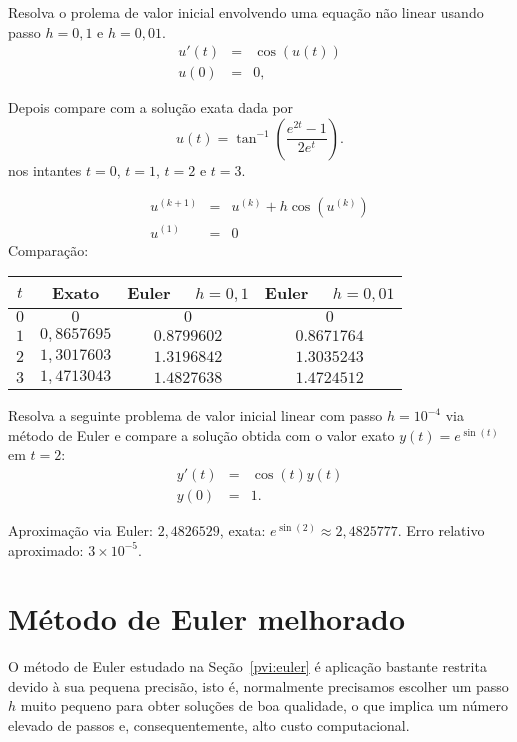 \begin{exer} Resolva o prolema de valor inicial envolvendo uma equação não linear usando passo $h=0,1$ e $h=0,01$. 
 \begin{eqnarray*}
    u'(t)&=&\cos(u(t))\\
    u(0)&=&0,
  \end{eqnarray*}

Depois compare com a solução exata dada por 
$$u(t)=\tan^{-1} \left( \frac {e^{2t}-1}{{2 e^t}}
 \right).
$$
nos intantes $t=0$, $t=1$, $t=2$ e $t=3$.
\end{exer}
\begin{resp}
 \begin{eqnarray*}
  u^{(k+1)}&=&u^{(k)}+h\cos(u^{(k)})\\
  u^{(1)}&=&0
\end{eqnarray*}
Comparação:
\begin{center}
\begin{tabular}{|c|c|c|c|}\hline
$t$ &  Exato & Euler~~ $h=0,1$ & Euler~~ $h=0,01$\\\hline
$0$ &  $0$ & $0$ & $0$\\\hline
$1$ &   $0,8657695 $ & $ 0.8799602$   &   $0.8671764 $  \\\hline
$2$ &   $1,3017603 $ & $ 1.3196842 $   &  $  1.3035243$     \\\hline
$3$ &   $1,4713043 $  & $ 1.4827638 $ & $1.4724512 $   \\\hline
\end{tabular}
\end{center}
\end{resp}

\begin{exer} Resolva a seguinte problema de valor inicial linear com passo $h=10^{-4}$ via método de Euler e compare a solução obtida com o valor exato $y(t)=e^{\sin(t)}$ em $t=2$:
 \begin{eqnarray*}
    y'(t)&=&\cos(t)y(t)\\
    y(0)&=&1.
  \end{eqnarray*}
\end{exer}  
\begin{resp}
 Aproximação via Euler: $2,4826529 $, exata: $e^{\sin(2)}\approx 2,4825777 $. Erro relativo aproximado: $ 3\times 10^{-5}$.
\end{resp}

\section{Método de Euler melhorado}\label{pvi:sec_euler_mod} 
O método de Euler estudado na Seção~\ref{pvi:euler} é aplicação bastante restrita devido à sua pequena precisão, isto é, normalmente precisamos escolher um passo $h$ muito pequeno para obter soluções de boa qualidade, o que implica um número elevado de passos e, consequentemente, alto custo computacional. 

